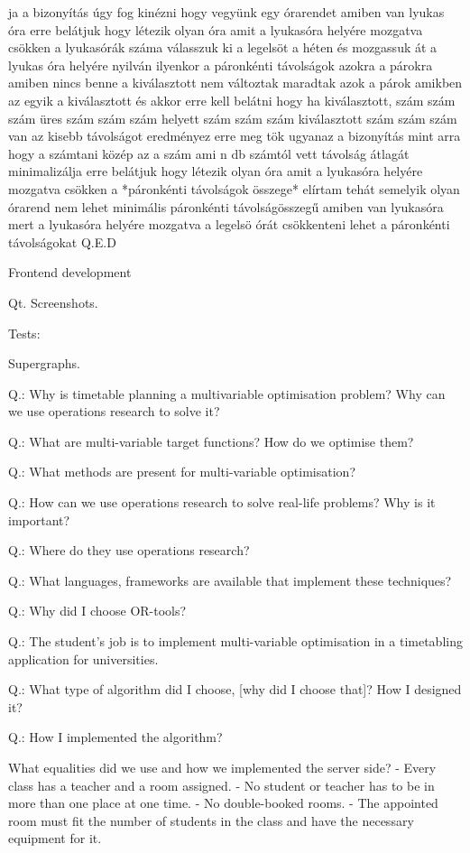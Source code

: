 ja a bizonyítás úgy fog kinézni hogy vegyünk egy órarendet amiben van lyukas óra
erre belátjuk hogy létezik olyan óra amit a lyukasóra helyére mozgatva csökken a lyukasórák száma
válasszuk ki a legelsöt a héten és mozgassuk át a lyukas óra helyére
nyilván ilyenkor a páronkénti távolságok azokra a párokra amiben nincs benne a kiválasztott nem változtak
maradtak azok a párok amikben az egyik a kiválasztott
és akkor erre kell belátni hogy ha
kiválasztott, szám szám szám üres szám szám szám
helyett
szám szám szám kiválasztott szám szám szám van
az kisebb távolságot eredményez
erre meg tök ugyanaz a bizonyítás
mint arra hogy a számtani közép az a szám ami n db számtól vett távolság átlagát minimalizálja
erre belátjuk hogy létezik olyan óra amit a lyukasóra helyére mozgatva csökken a *páronkénti távolságok összege*
elírtam
tehát semelyik olyan órarend nem lehet minimális páronkénti távolságösszegű amiben van lyukasóra mert a lyukasóra helyére mozgatva
a legelsö órát csökkenteni lehet a páronkénti távolságokat
Q.E.D

Frontend development

Qt. Screenshots.

Tests:

Supergraphs.

Q.: Why is timetable planning a multivariable optimisation problem? Why can we use operations research to solve it?

Q.: What are multi-variable target functions? How do we optimise them?

Q.: What methods are present for multi-variable optimisation?

Q.: How can we use operations research to solve real-life problems? Why is it important?

Q.: Where do they use operations research?

Q.: What languages, frameworks are available that implement these techniques? 

Q.: Why did I choose OR-tools?


Q.: The student's job is to implement multi-variable optimisation in a timetabling application for universities.

Q.: What type of algorithm did I choose, [why did I choose that]? How I designed it?

Q.: How I implemented the algorithm?

What equalities did we use and how we implemented the server side?
- Every class has a teacher and a room assigned.
- No student or teacher has to be in more than one place at one time.
- No double-booked rooms.
- The appointed room must fit the number of students in the class and have the necessary equipment for it.

